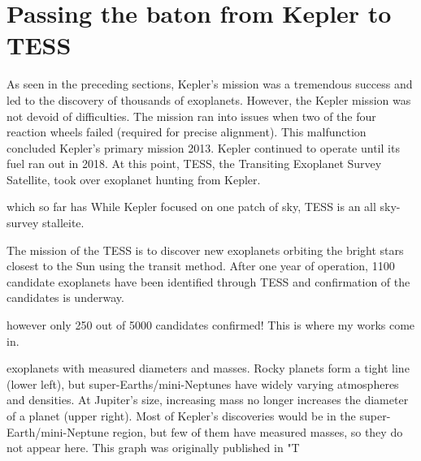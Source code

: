 \section{Passing the baton from Kepler to TESS }

As seen in the preceding sections, Kepler's mission was a tremendous success and led to the discovery of thousands of exoplanets.
However, the Kepler mission was not devoid of difficulties.
The mission ran into issues when two of the four reaction wheels failed (required for precise alignment). 
This malfunction concluded Kepler's primary mission 2013.
Kepler continued to operate until its fuel ran out in 2018.
At this point, TESS, the Transiting Exoplanet Survey Satellite, took over exoplanet hunting from Kepler.




which so far has 
While Kepler focused on one patch of sky, TESS is an all sky-survey stalleite. 

The mission of the TESS is to discover new exoplanets orbiting the bright stars closest to the Sun using the transit method. After one year of operation, 1100 candidate exoplanets have been identified through TESS and confirmation of the candidates is underway.

however only 250 out of 5000 candidates confirmed! This is where my works come in.






exoplanets with measured diameters and masses. Rocky planets form a tight line (lower left), but super-Earths/mini-Neptunes have widely varying atmospheres and densities. At Jupiter’s size, increasing mass no longer increases the diameter of a planet (upper right). Most of Kepler’s discoveries would be in the super-Earth/mini-Neptune region, but few of them have measured masses, so they do not appear here. This graph was originally published in "T






